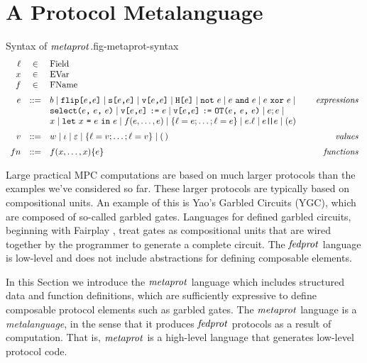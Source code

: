 \section{A Protocol Metalanguage}
\label{section-metalang}

\begin{fpfig}[t]{Syntax of $\mathit{metaprot}$.}{fig-metaprot-syntax}
$$
\begin{array}{rcl@{\hspace{8mm}}r}
\flab &\in& \mathrm{Field}\\
x &\in& \mathrm{EVar}\\
f &\in& \mathrm{FName}\\[2mm]
e &::=& b \mid \flip{e}{e} \mid \secret{e}{e} \mid \view{e}{e} \mid \oracle{e} \mid \enot\ e \mid e\ \eand\ e \mid e\ \exor\ e \mid & \textit{expressions}\\[0mm]
& & \select{e}{e}{e} \mid 
\send{\view{e}{e}}{e} \mid \send{\view{e}{e}}{\OT{e}{e}{e}} \mid e;e \mid \\[0mm]
& & x \mid \elet{x}{e}{e} \mid f(e,\ldots,e) \mid \{ \flab = e; \ldots; \flab = e \}
\mid e.\flab \mid e\concat e \mid (e) \\[2mm]
v &::=& w \mid \cid \mid \be \mid \{ \flab = v;\ldots;\flab = v \} 
\mid (\,) & \textit{values}\\[2mm]
{fn} &::=& f(x,\ldots,x) \{ e \} & \textit{functions}
\end{array}
$$
\end{fpfig}

Large practical MPC computations are based on much larger protocols
than the examples we've considered so far. These larger protocols are
typically based on compositional units. An example of this is Yao's
Garbled Circuits (YGC), which are composed of so-called garbled gates.
Languages for defined garbled circuits, beginning with Fairplay \cite{XXX},
treat gates as compositional units that are wired together by the programmer
to generate a complete circuit. The $\mathit{fedprot}$ language is low-level
and does not include abstractions for defining composable elements. 

In this Section we introduce the $\mathit{metaprot}$ language which includes
structured data and function definitions, which are sufficiently
expressive to define composable protocol elements such as garbled
gates. The $\mathit{metaprot}$ language is a \emph{metalanguage}, in the sense
that it produces $\mathit{fedprot}$ protocols as a result of computation. That
is, $\mathit{metaprot}$ is a high-level language that generates low-level
protocol code.


